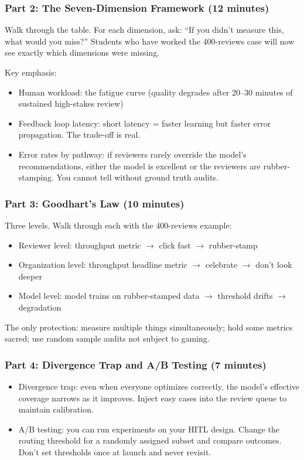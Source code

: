 \subsubsection{Part 2: The Seven-Dimension Framework (12 minutes)}

Walk through the table. For each dimension, ask: ``If you didn't measure this, what would you miss?'' Students who have worked the 400-reviews case will now see exactly which dimensions were missing.

Key emphasis:
\begin{itemize}
    \item Human workload: the fatigue curve (quality degrades after 20--30 minutes of sustained high-stakes review)
    \item Feedback loop latency: short latency = faster learning but faster error propagation. The trade-off is real.
    \item Error rates by pathway: if reviewers rarely override the model's recommendations, either the model is excellent or the reviewers are rubber-stamping. You cannot tell without ground truth audits.
\end{itemize}

\subsubsection{Part 3: Goodhart's Law (10 minutes)}

Three levels. Walk through each with the 400-reviews example:
\begin{itemize}
    \item Reviewer level: throughput metric $\to$ click fast $\to$ rubber-stamp
    \item Organization level: throughput headline metric $\to$ celebrate $\to$ don't look deeper
    \item Model level: model trains on rubber-stamped data $\to$ threshold drifts $\to$ degradation
\end{itemize}

The only protection: measure multiple things simultaneously; hold some metrics sacred; use random sample audits not subject to gaming.

\subsubsection{Part 4: Divergence Trap and A/B Testing (7 minutes)}

\begin{itemize}
    \item Divergence trap: even when everyone optimizes correctly, the model's effective coverage narrows as it improves. Inject easy cases into the review queue to maintain calibration.
    \item A/B testing: you can run experiments on your HITL design. Change the routing threshold for a randomly assigned subset and compare outcomes. Don't set thresholds once at launch and never revisit.
\end{itemize}

